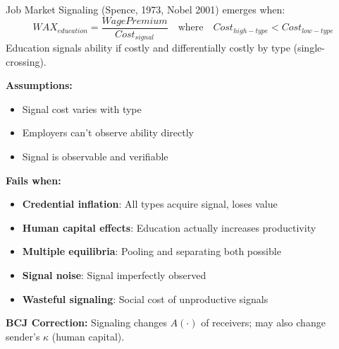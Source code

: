 
\begin{theorem}
\label{thm:spence-signaling}
Job Market Signaling (Spence, 1973, Nobel 2001) emerges when:
\begin{equation}
\boxed{WAX_{education} = \frac{Wage Premium}{Cost_{signal}} \quad \text{where} \quad Cost_{high-type} < Cost_{low-type}}
\end{equation}
Education signals ability if costly and differentially costly by type (single-crossing).
\end{theorem}

\begin{tcolorbox}[colback=red!5!white, colframe=red!75!black, title=Boundary Condition: Where Signaling Fails]
\textbf{Assumptions:}
\begin{itemize}[nosep]
\item Signal cost varies with type
\item Employers can't observe ability directly
\item Signal is observable and verifiable
\end{itemize}

\textbf{Fails when:}
\begin{itemize}[nosep]
\item \textbf{Credential inflation}: All types acquire signal, loses value
\item \textbf{Human capital effects}: Education actually increases productivity
\item \textbf{Multiple equilibria}: Pooling and separating both possible
\item \textbf{Signal noise}: Signal imperfectly observed
\item \textbf{Wasteful signaling}: Social cost of unproductive signals
\end{itemize}

\textbf{BCJ Correction:} Signaling changes $A(\cdot)$ of receivers; may also change sender's $\kappa$ (human capital).
\end{tcolorbox}


